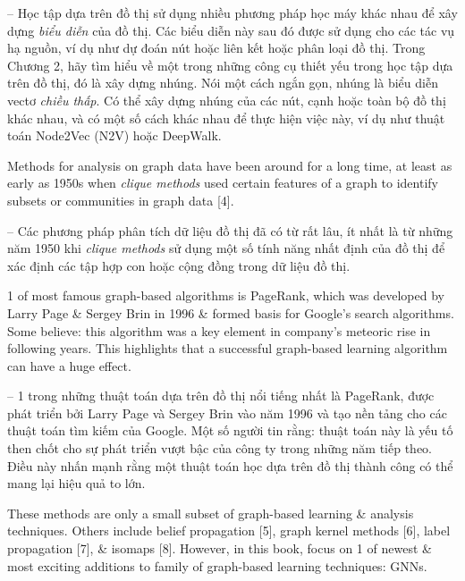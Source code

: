 \documentclass{article}
\begin{document}
\begin{itemize}
\begin{itemize}
\begin{itemize}
            -- Học tập dựa trên đồ thị sử dụng nhiều phương pháp học máy khác nhau để xây dựng {\it biểu diễn} của đồ thị. Các biểu diễn này sau đó được sử dụng cho các tác vụ hạ nguồn, ví dụ như dự đoán nút hoặc liên kết hoặc phân loại đồ thị. Trong Chương 2, hãy tìm hiểu về một trong những công cụ thiết yếu trong học tập dựa trên đồ thị, đó là xây dựng nhúng. Nói một cách ngắn gọn, nhúng là biểu diễn vectơ {\it chiều thấp}. Có thể xây dựng nhúng của các nút, cạnh hoặc toàn bộ đồ thị khác nhau, và có một số cách khác nhau để thực hiện việc này, ví dụ như thuật toán Node2Vec (N2V) hoặc DeepWalk.

            Methods for analysis on graph data have been around for a long time, at least as early as 1950s when {\it clique methods} used certain features of a graph to identify subsets or communities in graph data [4].

            -- Các phương pháp phân tích dữ liệu đồ thị đã có từ rất lâu, ít nhất là từ những năm 1950 khi {\it clique methods} sử dụng một số tính năng nhất định của đồ thị để xác định các tập hợp con hoặc cộng đồng trong dữ liệu đồ thị.

            1 of most famous graph-based algorithms is PageRank, which was developed by {\sc Larry Page \& Sergey Brin} in 1996 \& formed basis for Google's search algorithms. Some believe: this algorithm was a key element in company's meteoric rise in following years. This highlights that a successful graph-based learning algorithm can have a huge effect.

            -- 1 trong những thuật toán dựa trên đồ thị nổi tiếng nhất là PageRank, được phát triển bởi Larry Page và Sergey Brin vào năm 1996 và tạo nền tảng cho các thuật toán tìm kiếm của Google. Một số người tin rằng: thuật toán này là yếu tố then chốt cho sự phát triển vượt bậc của công ty trong những năm tiếp theo. Điều này nhấn mạnh rằng một thuật toán học dựa trên đồ thị thành công có thể mang lại hiệu quả to lớn.

            These methods are only a small subset of graph-based learning \& analysis techniques. Others include belief propagation [5], graph kernel methods [6], label propagation [7], \& isomaps [8]. However, in this book, focus on 1 of newest \& most exciting additions to family of graph-based learning techniques: GNNs.


\end{itemize}
\end{itemize}
\end{itemize}
\end{document}
